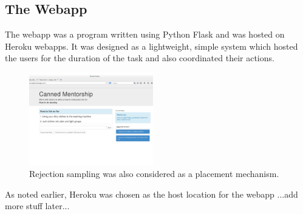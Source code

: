 \subsection{The Webapp}
The webapp was a program written using Python Flask and was hosted on Heroku webapps. 
It was designed as a lightweight, simple system which hosted the users for the duration of the task and also coordinated their actions.

\begin{figure}[h]
	\begin{center}
		\includegraphics[width=0.48\textwidth]{figures/cmInterface2.png}
		\caption{Rejection sampling was also considered as a placement mechanism.}
		\label{fig:rejection_sampling_placement}
	\end{center}
\end{figure}

As noted earlier, Heroku was chosen as the host location for the webapp ...add more stuff later...




%

